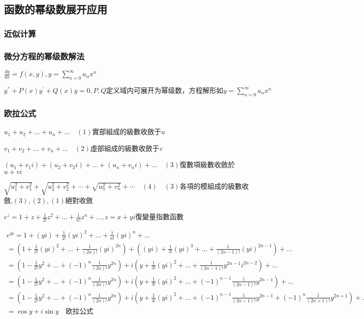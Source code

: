 \documentclass[UTF8]{ctexart}
\newcommand{\mt}[1]{\text{#1}}
\newcommand{\mf}[1]{\left( #1\right)}
\newcommand{\q}{\quad}
\newcommand{\ma}[1]{\begin{array}{llll} #1 \end{array}}
\newcommand{\jisu}[1]{\sum_{n=0}^\infty #1}
\begin{document}
\subsection{函数的幂级数展开应用 }

\subsubsection{近似计算 }

\subsubsection{微分方程的幂级数解法 }

$\frac{dy}{dx}=f\mf{x,y},y=\jisu{a_nx^n}$

$y^{''}+P\mf{x}y^{'}+Q\mf{x}y=0,P,Q\mt{定义域内可展开为幂级数，方程解形如}y=\jisu{a_nx^n}$


\subsubsection{欧拉公式 }




$ u_1+u_2+\dots+u_n+\dots  \q \mf{1}$實部組成的級數收斂于$u$

$v_1+v_2+\dots+v_n+\dots  \q \mf{2}$虛部組成的級數收斂于$v$

$\mf{u_1+v_1i}+\mf{u_2+v_2i}+\dots+\mf{u_n+v_ni}+\dots  \q \mf{3}$復數項級數收斂於$u+vi$

$\sqrt{u_1^2+v_1^2}+\sqrt{u_2^2+v_2^2}+\cdots+\sqrt{u_n^2+v_n^2}+\cdots \q \mf{4} \q \mf{3}$各項的模組成的級數收斂,$\mf{3},\mf{2},\mf{1}$絕對收斂
 


$e^z=1+z+\frac{1}{2!}z^2+\dots+\frac{1}{n!}z^n+\dots,z=x+yi$復變量指數函數

$\ma{e^{yi}=1+\mf{yi}+\frac{1}{2!}\mf{yi}^2+\dots+\frac{1}{n!}\mf{yi}^n+\dots\\
    =\mf{1+\frac{1}{2!}\mf{yi}^2+\dots+ \frac{1}{\mf{2n}!}\mf{yi}^{2n}}+\mf{\mf{yi}+\frac{1}{3!}\mf{yi}^3+\dots+ \frac{1}{\mf{2n-1}!}\mf{yi}^{2n-1}}+\dots\\
    =\mf{1-\frac{1}{2!}y^2+\dots+ \mf{-1}^n\frac{1}{\mf{2n}!}y^{2n}}+
    i\mf{y+\frac{1}{3!}\mf{yi}^2+\dots+ \frac{1}{\mf{2n-1}!}y^{2n-1}i^{2n-2}}+\dots\\
    =\mf{1-\frac{1}{2!}y^2+\dots+ \mf{-1}^n\frac{1}{\mf{2n}!}y^{2n}}+
    i\mf{y+\frac{1}{3!}\mf{yi}^2+\dots+ \mf{-1}^{n-1}\frac{1}{\mf{2n-1}!}y^{2n-1}}+\dots\\
    =\mf{1-\frac{1}{2!}y^2+\dots+ \mf{-1}^n\frac{1}{\mf{2n}!}y^{2n}}+
    i\mf{y+\frac{1}{3!}\mf{yi}^2+\dots+ \mf{-1}^{n-1}\frac{1}{\mf{2n-1}!}y^{2n-1}+ \mf{-1}^{n}\frac{1}{\mf{2n+1}!}y^{2n+1}}+\dots\\
    =\cos y + i \sin y \q \mt{欧拉公式}\\
}$
\end{document}
